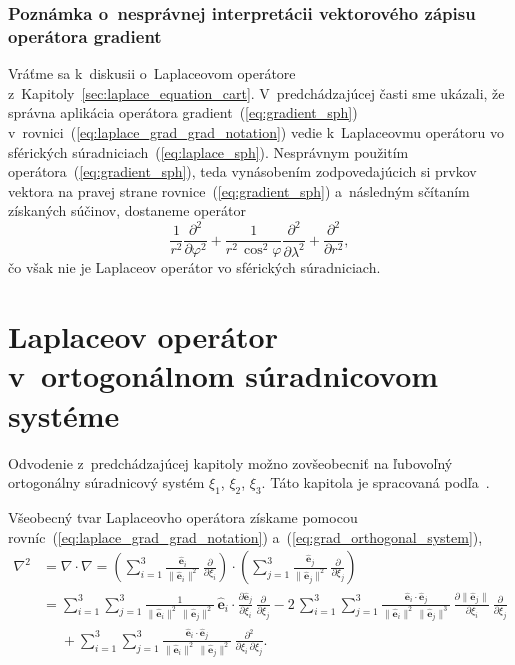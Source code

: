 \documentclass[a4paper,12pt]{book}
\let\vec\mathbf
\begin{document}
\subsubsection{Poznámka o~nesprávnej interpretácii vektorového zápisu operátora 
gradient}

Vráťme sa k~diskusii o~Laplaceovom operátore 
z~Kapitoly~\ref{sec:laplace_equation_cart}.  V~predchádzajúcej časti sme 
ukázali, že správna aplikácia operátora gradient~(\ref{eq:gradient_sph}) 
v~rovnici~(\ref{eq:laplace_grad_grad_notation}) vedie k~Laplaceovmu operátoru 
vo sférických súradniciach~(\ref{eq:laplace_sph}).  Nesprávnym použitím 
operátora~(\ref{eq:gradient_sph}), teda vynásobením zodpovedajúcich si prvkov 
vektora na pravej strane rovnice~(\ref{eq:gradient_sph}) a~následným sčítaním 
získaných súčinov, dostaneme operátor
%
\begin{equation}
\frac{1}{r^2} \frac{\partial^2}{\partial \varphi^2} + \frac{1}{r^2 \, 
\cos^2\varphi} \frac{\partial^2}{\partial \lambda^2} 
+ \frac{\partial^2}{\partial r^2}{,}
\end{equation}
%
čo však nie je Laplaceov operátor vo sférických súradniciach.




\section{Laplaceov operátor v~ortogonálnom súradnicovom systéme}
\label{app:laplace_in_orthogonal_coordinates}

Odvodenie z~predchádzajúcej kapitoly možno zovšeobecniť na ľubovoľný 
ortogonálny súradnicový systém $\xi_1$, $\xi_2$, $\xi_3$.  Táto kapitola je 
spracovaná podľa~\textcite{SansoGeoidDetermination}.

Všeobecný tvar Laplaceovho operátora získame pomocou 
rovníc~(\ref{eq:laplace_grad_grad_notation}) 
a~(\ref{eq:grad_orthogonal_system}),
%
\begin{equation}
\label{eq:laplace_orthogonal_system_1}
\begin{split}
\nabla^2 &= \nabla \cdot \nabla = \left( \sum_{i = 1}^3 \frac{\hat{\vec 
e}_i}{\| \hat{\vec e}_i \|^2} \, \frac{\partial}{\partial \xi_i}\right) \cdot 
\left( \sum_{j = 1}^3 \frac{\hat{\vec e}_j}{\| \hat{\vec e}_j \|^2} \, 
\frac{\partial}{\partial \xi_j}
\right)\\
%
&= \sum_{i = 1}^{3} \sum_{j = 1}^3 \frac{1}{\| \hat{\vec e}_i \|^2 \, \| 
\hat{\vec e}_j \|^2} \, \hat{\vec e}_i \cdot \frac{\partial \hat{\vec 
e}_j}{\partial \xi_i} \, \frac{\partial}{\partial \xi_j}
- 2\, \sum_{i = 1}^{3} \sum_{j = 1}^3 \frac{\hat{\vec e}_i \cdot \hat{\vec 
e}_j}{\| \hat{\vec e}_i \|^2 \, \|\hat{\vec e}_j \|^3} \, \frac{\partial \| 
\hat{\vec e}_j \|}{\partial \xi_i} \, \frac{\partial}{\partial \xi_j}\\
%
&\phantom{={}}+ \sum_{i = 1}^{3} \sum_{j = 1}^3 \frac{\hat{\vec e}_i \cdot 
\hat{\vec e}_j}{\| \hat{\vec e}_i \|^2 \, \| \hat{\vec e}_j \|^2} \, 
\frac{\partial^2}{\partial \xi_i \, \partial \xi_j}{.}
\end{split}
%
\end{equation}
\end{document}
